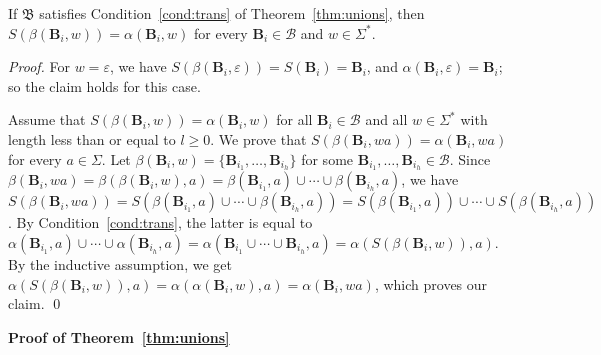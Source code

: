 \documentclass{llncs}
\renewcommand{\ge}{\geqslant}
\newcommand{\eps}{\varepsilon}
\newcommand{\Sig}{\Sigma}
\newcommand{\noin}{\noindent}
\newcommand{\bmB}{\bm{B}}
\newcommand{\cB}{{\mathcal B}}
\newcommand{\fB}{{\mathfrak B}}
\begin{document}
\begin{lemma}
\label{lem:beta}
If $\fB$ satisfies Condition~\ref{cond:trans} of Theorem~\ref{thm:unions}, then
$S(\beta(\bmB_i,w)) = \alpha(\bmB_i,w)$ 
for every $\bmB_i\in \cB$ and $w\in \Sig^*$.
\end{lemma}
\begin{proof}
For $w=\eps$, we have $S(\beta(\bmB_i,\eps))=S(\bmB_i)=\bmB_i$, and 
$\alpha(\bmB_i,\eps)=\bmB_i$; so the claim holds for this case.

Assume that $S(\beta(\bmB_i,w))=\alpha(\bmB_i,w)$
for all $\bmB_i\in \cB$ and all $w\in \Sig^*$ with length less than or 
equal to $l\ge 0$. 
We prove that $S(\beta(\bmB_i,wa))=\alpha(\bmB_i,wa)$ for every $a\in \Sig$.
Let $\beta(\bmB_i,w)=\{\bmB_{i_1},\ldots,\bmB_{i_h}\}$ for
some $\bmB_{i_1},\ldots,\bmB_{i_h}\in \cB$. 
Since $\beta(\bmB_i,wa)=\beta(\beta(\bmB_i,w),a)=
\beta(\bmB_{i_1},a)\cup\cdots\cup\beta(\bmB_{i_h},a)$, we have
$S(\beta(\bmB_i,wa))=S(\beta(\bmB_{i_1},a)\cup\cdots\cup\beta(\bmB_{i_h},a))=
S(\beta(\bmB_{i_1},a))\cup\cdots\cup S(\beta(\bmB_{i_h},a))$.
By   Condition~\ref{cond:trans}, the latter is equal 
to $\alpha(\bmB_{i_1},a)\cup\cdots\cup \alpha(\bmB_{i_h},a)=
\alpha(\bmB_{i_1}\cup\cdots\cup\bmB_{i_h},a)=
\alpha(S(\beta(\bmB_i,w)),a)$.
By the inductive assumption, we get
$\alpha(S(\beta(\bmB_i,w)),a)=\alpha(\alpha(\bmB_i,w),a)=
\alpha(\bmB_i,wa)$, which proves our claim.
\qed
\end{proof}
\noin
{\bf Proof of Theorem~\ref{thm:unions}}
\end{document}
